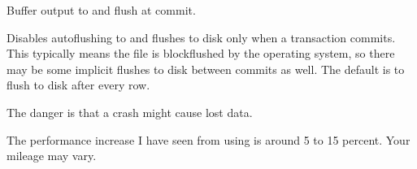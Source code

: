 \documentclass[letterpaper,10pt,english]{sphinxmanual}
\begin{document}

\begin{fulllineitems}
\label{\detokenize{mariadb-archiver:cmdoption-mariadb-archiver-buffer}}
Buffer output to {\hyperref[\detokenize{mariadb-archiver:cmdoption-mariadb-archiver-file}]{}} and flush at commit.

Disables autoflushing to {\hyperref[\detokenize{mariadb-archiver:cmdoption-mariadb-archiver-file}]{}} and flushes {\hyperref[\detokenize{mariadb-archiver:cmdoption-mariadb-archiver-file}]{}} to disk only when a
transaction commits.  This typically means the file is block\sphinxhyphen{}flushed by the
operating system, so there may be some implicit flushes to disk between
commits as well.  The default is to flush {\hyperref[\detokenize{mariadb-archiver:cmdoption-mariadb-archiver-file}]{}} to disk after every row.

The danger is that a crash might cause lost data.

The performance increase I have seen from using {\hyperref[\detokenize{mariadb-archiver:cmdoption-mariadb-archiver-buffer}]{}} is around 5 to 15
percent.  Your mileage may vary.

\end{fulllineitems}

\end{document}
